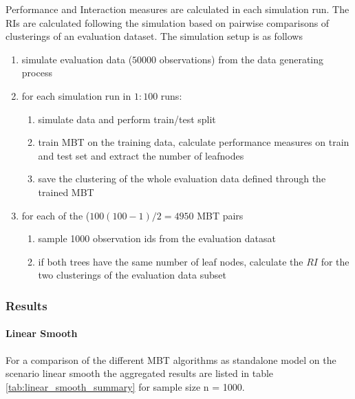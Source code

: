 Performance and Interaction measures are calculated in each simulation run.  
The RIs are calculated following the simulation based on pairwise comparisons of clusterings of an evaluation dataset. The simulation setup is as follows

\begin{enumerate}
    \item simulate evaluation data ($50000$ observations) from the data generating process
    \item for each simulation run in $1:100$ runs:
    \begin{enumerate}
        \item simulate data and perform train/test split
        \item train MBT on the training data, calculate performance measures on train and test set and extract the number of leafnodes
        \item save the clustering of the whole evaluation data defined through the trained MBT
    \end{enumerate}
    \item for each of the ($100(100-1)/2 = 4950$ MBT pairs
    \begin{enumerate}
        \item sample 1000 observation ids from the evaluation datasat
        \item if both trees have the same number of leaf nodes, calculate the $RI$ for the two clusterings of the evaluation data subset
    \end{enumerate}
\end{enumerate}

\subsubsection{Results}
\paragraph{Linear Smooth}
For a comparison of the different MBT algorithms as standalone model on the scenario linear smooth the aggregated results are listed in table \ref{tab:linear_smooth_summary} for sample size n = 1000. 

